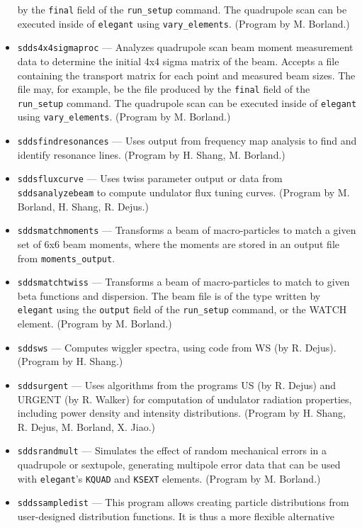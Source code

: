 \documentclass[11pt]{article}
\begin{document}
\begin{itemize}
        by the {\tt final} field of the {\tt run\_setup} command.  The quadrupole scan can be
        executed inside of {\tt elegant} using {\tt vary\_elements}. (Program by M. Borland.)
\item {\tt sdds4x4sigmaproc} --- Analyzes quadrupole scan beam moment measurement data to determine
  the initial 4x4 sigma matrix of the beam.  Accepts a
  file containing the transport matrix for each point and measured beam sizes.  
  The file may, for example, be the file produced
  by the {\tt final} field of the {\tt run\_setup} command.  The quadrupole scan can be
  executed inside of {\tt elegant} using {\tt vary\_elements}. (Program by M. Borland.)
\item {\tt sddsfindresonances} --- Uses output from frequency map analysis to find and identify resonance lines.
 (Program by H. Shang, M. Borland.)
\item {\tt sddsfluxcurve} --- Uses twiss parameter output or data from {\tt sddsanalyzebeam} to
  compute undulator flux tuning curves.  (Program by M. Borland, H. Shang, R. Dejus.)
\item {\tt sddsmatchmoments} --- Transforms a beam of macro-particles to match a given set of 
  6x6 beam moments, where the moments are stored in an output file from \verb|moments_output|.
\item {\tt sddsmatchtwiss} --- Transforms a beam of macro-particles to match to given beta
        functions and dispersion.    The beam file
        is of the type written by {\tt elegant} using the {\tt output} field of the {\tt run\_setup}
        command, or the WATCH element. (Program by M. Borland.)
\item {\tt sddsws} --- Computes wiggler spectra, using code from WS (by R. Dejus).
  (Program by H. Shang.)
\item {\tt sddsurgent} --- Uses algorithms from the programs US (by R. Dejus) and URGENT (by R. Walker) for computation of undulator
  radiation properties, including power density and intensity distributions.  (Program by H. Shang, R. Dejus, M. Borland, X. Jiao.)
\item {\tt sddsrandmult} --- Simulates the effect of random mechanical errors in a quadrupole or sextupole,
  generating multipole error data that can be used with {\tt elegant}'s {\tt KQUAD} and {\tt KSEXT}
  elements. (Program by M. Borland.)
\item {\tt sddssampledist} --- This program allows creating particle
        distributions from user-designed distribution functions.  It is thus a more flexible alternative

\end{itemize}
\end{document}
